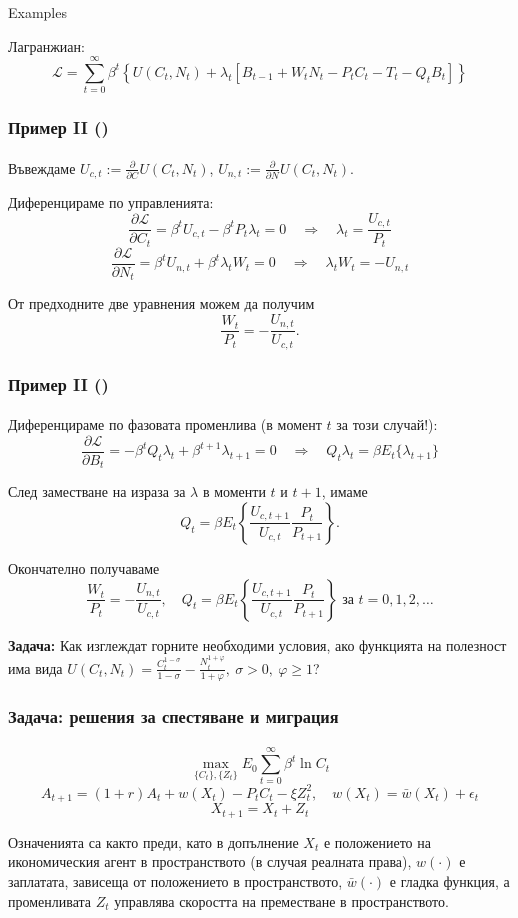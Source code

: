 \documentclass[10pt]{beamer}
\theoremstyle{definition}
\begin{document}
\begin{section}{Examples}
\begin{frame}
Лагранжиан:\[ \mathcal{L} = \sum_{t=0}^{\infty}\beta^t \left\{U(C_t,N_t)+\lambda_t \left[ B_{t-1} + W_t N_t - P_t C_t - T_t - Q_t B_t \right] \right\} \]
\end{frame}




\begin{frame}
\frametitle{Пример II ()}
\framesubtitle{}
Въвеждаме $ U_{c,t} := \frac{\partial}{\partial C}U(C_t,N_t)$, $ U_{n,t} := \frac{\partial}{\partial N}U(C_t,N_t)$.\bigskip

Диференцираме по управленията:
\[ \frac{\partial \mathcal{L} }{\partial C_t} = \beta^t U_{c,t} - \beta^t P_t \lambda_t = 0 \quad\Longrightarrow\quad \lambda_t = \frac{U_{c,t}}{P_t} \]
\[  \frac{\partial \mathcal{L} }{\partial N_t} = \beta^t U_{n,t}+\beta^t \lambda_t W_t =0 \quad\Longrightarrow\quad \lambda_t W_t = -U_{n,t}  \]\bigskip

От предходните две уравнения можем да получим \[ \frac{W_t}{P_t} = -\frac{U_{n,t}}{U_{c,t}}. \]
\end{frame}




\begin{frame}
\frametitle{Пример II ()}
\framesubtitle{}
Диференцираме по фазовата променлива (в момент $ t $ за този случай!):
\[ \frac{\partial \mathcal{L} }{\partial B_t} = -\beta^t Q_t \lambda_t + \beta^{t+1}\lambda_{t+1} = 0 \quad\Longrightarrow\quad Q_t \lambda_t = \beta E_t \{\lambda_{t+1}\} \]

След заместване на израза за $ \lambda $ в моменти $ t $ и $ t+1 $, имаме 
\[ Q_t = \beta E_t \left\{ \frac{U_{c,t+1}}{U_{c,t}}\frac{P_t}{P_{t+1}} \right\} .  \]

Окончателно получаваме \[ \frac{W_t}{P_t} = -\frac{U_{n,t}}{U_{c,t}}, \quad Q_t = \beta E_t \left\{ \frac{U_{c,t+1}}{U_{c,t}}\frac{P_t}{P_{t+1}} \right\} \text{ за } t=0,1,2,\ldots \]

\textbf{Задача:} Как изглеждат горните необходими условия, ако функцията на полезност има вида $ U(C_t,N_t)=\frac{C_t^{1-\sigma}}{1-\sigma}-\frac{N_t^{1+\varphi}}{1+\varphi},~\sigma>0,~\varphi \geq 1 $?
\end{frame}



\begin{frame}
\frametitle{Задача: решения за спестяване и миграция}
\framesubtitle{}
\[ \max_{\{C_t\},\{Z_t\}} E_0 \sum_{t=0}^{\infty}\beta^t \ln C_t  \]
\[ A_{t+1}=(1+r)A_t+w(X_t)-P_t C_t -\xi Z_t^2,\quad w(X_t) = \bar{w}(X_t)+\epsilon_t \]
\[ X_{t+1}  = X_t+Z_t \]

Означенията са както преди, като в допълнение $ X_t $ е положението на икономическия агент в пространството (в случая реалната права), $ w(\cdot) $ е заплатата, зависеща от положението в пространството, $ \bar{w}(\cdot) $ е гладка функция, а променливата $ Z_t $ управлява скоростта на преместване в пространството.
\end{frame}
\end{section}
\end{document}
